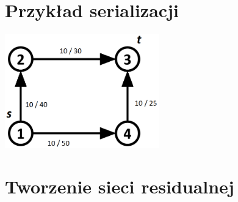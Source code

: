 \documentclass[a4paper]{book}
\begin{document}
\begin{appendices}
 	\chapter{Przykład serializacji}\label{add:A}
 	\begin{center}
 		\includegraphics[width=0.5\textwidth]{./img/serialized_graph.png}
 	\end{center}
 	
 	\vfill
 	
 	\vfill
 	\chapter{Tworzenie sieci residualnej}\label{add:B}
 	\vspace{-1cm}

\end{appendices}
\end{document}
